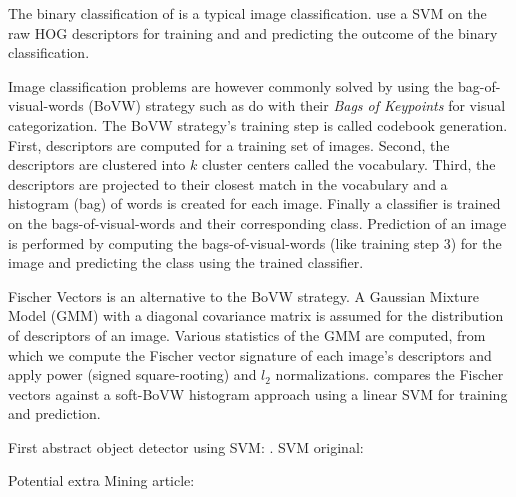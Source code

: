 \documentclass[thesis.tex]{subfiles}
\begin{document}
The binary classification of \citet{dalal2005histograms} is a typical image classification. \citet{dalal2005histograms} use a SVM on the raw HOG descriptors for training and and predicting the outcome of the binary classification.

Image classification problems are however commonly solved by using the bag-of-visual-words (BoVW) strategy such as \citet{csurka2004visual} do with their \emph{Bags of Keypoints} for visual categorization. The BoVW strategy's training step is called codebook generation. First, descriptors are computed for a training set of images. Second, the descriptors are clustered into $k$ cluster centers called the vocabulary. Third, the descriptors are projected to their closest match in the vocabulary and a histogram (bag) of words is created for each image. Finally a classifier is trained on the bags-of-visual-words and their corresponding class. Prediction of an image is performed by computing the bags-of-visual-words (like training step 3) for the image and predicting the class using the trained classifier.

Fischer Vectors \cite{sanchez2013image} is an alternative to the BoVW strategy. A Gaussian Mixture Model (GMM) with a diagonal covariance matrix is assumed for the distribution of descriptors of an image. Various statistics of the GMM are computed, from which we compute the Fischer vector signature of each image's descriptors and apply power (signed square-rooting) and $l_2$ normalizations. \citet{sanchez2013image} compares the Fischer vectors against a soft-BoVW  histogram approach using a linear SVM for training and prediction.

First abstract object detector using SVM: \cite{papageorgiou2000trainable}.
SVM original: \cite{boser1992training}
 
Potential extra Mining article: \cite{fernando2014mining}

\subbibliography
\end{document}
